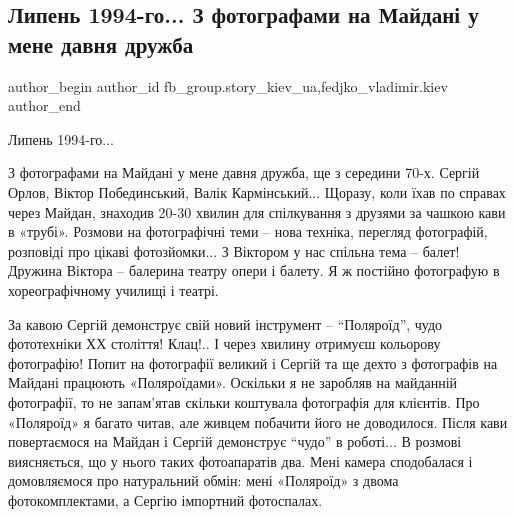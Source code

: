  
 
 
 
 
 
\subsection{Липень 1994-го... З фотографами на Майдані у мене давня дружба}
\label{sec:05_12_2021.fb.fb_group.story_kiev_ua.2.1994_maidan_foto}
 
\ifcmt
 author_begin
   author_id fb_group.story_kiev_ua,fedjko_vladimir.kiev
 author_end
\fi

\begin{multicols}{2} %

\begingroup
\Large
Липень 1994-го... 

\medskip
З фотографами на Майдані у мене давня дружба, ще з середини
70-х. Сергій Орлов, Віктор Побединський, Валік Кармінський... Щоразу, коли їхав
по справах через Майдан, знаходив 20-30 хвилин для спілкування з друзями за
чашкою кави в «трубі». Розмови на фотографічні теми – нова техніка, перегляд
фотографій, розповіді про цікаві фотозйомки... З Віктором у нас спільна тема –
балет! Дружина Віктора – балерина театру опери і балету. Я ж постійно
фотографую в хореографічному училищі і театрі. 
\endgroup

\vspace{3.0cm}

\setlength{\parindent}{0pt}


\end{multicols} %

За кавою Сергій демонструє свій новий інструмент – \enquote{Поляроїд}, чудо фототехніки
ХХ століття! Клац!.. І через хвилину отримуєш кольорову фотографію! Попит на
фотографії великий і Сергій та ще дехто з фотографів на Майдані працюють
«Поляроїдами». Оскільки я не заробляв на майданній фотографії, то не запам’ятав
скільки коштувала фотографія для клієнтів. Про «Поляроїд» я багато читав, але
живцем побачити його не доводилося.  Після кави повертаємося на Майдан і Сергій
демонструє \enquote{чудо} в роботі... В розмові виясняється, що у нього таких
фотоапаратів два. Мені камера сподобалася і домовляємося про натуральний обмін:
мені «Поляроїд» з двома фотокомплектами, а Сергію імпортний фотоспалах.

